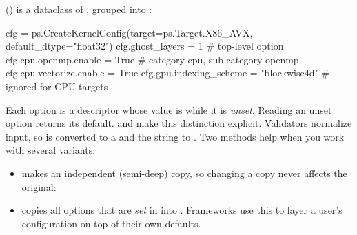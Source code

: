  () is a dataclass of
, grouped into :
\begin{pycode}
cfg = ps.CreateKernelConfig(target=ps.Target.X86_AVX, default_dtype="float32")
cfg.ghost_layers = 1                        # top-level option
cfg.cpu.openmp.enable = True                # category cpu, sub-category openmp
cfg.cpu.vectorize.enable = True
cfg.gpu.indexing_scheme = "blockwise4d"     # ignored for CPU targets
\end{pycode}
Each option is a descriptor whose value is  while it is \emph{unset}. Reading
an unset option returns its default.  and
 make this distinction explicit. Validators normalize
input, so  is converted to a  and the
string  to . Two methods help
when you work with several variants:
\begin{itemize}
  \item {} makes an independent (semi-deep) copy, so changing a copy never
        affects the original:
  \item {} copies all options that are \emph{set} in
         into . Frameworks use this to layer a user's
        configuration on top of their own defaults.
\end{itemize}

